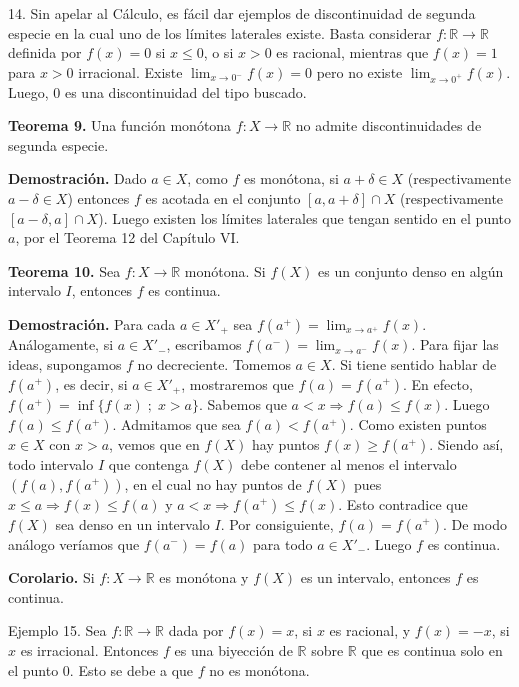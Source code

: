 \documentclass[12pt,oneside]{book}
\begin{document}
14. Sin apelar al Cálculo, es fácil dar ejemplos de discontinuidad de segunda especie en la cual uno de los límites laterales existe. Basta considerar \(f: \mathbb{R} \to \mathbb{R}\) definida por \(f(x) = 0\) si \(x \leq 0\), o si \(x > 0\) es racional, mientras que \(f(x) = 1\) para \(x > 0\) irracional. Existe \(\lim_{x \to 0^-} f(x) = 0\) pero no existe \(\lim_{x \to 0^+} f(x)\). Luego, \(0\) es una discontinuidad del tipo buscado.

\textbf{Teorema 9.} Una función monótona \(f: X \to \mathbb{R}\) no admite discontinuidades de segunda especie.

\textbf{Demostración.} Dado \(a \in X\), como \(f\) es monótona, si \(a + \delta \in X\) (respectivamente \(a - \delta \in X\)) entonces \(f\) es acotada en el conjunto \([a, a + \delta] \cap X\) (respectivamente \([a - \delta, a] \cap X\)). Luego existen los límites laterales que tengan sentido en el punto \(a\), por el Teorema 12 del Capítulo VI.

\textbf{Teorema 10.} Sea \(f: X \to \mathbb{R}\) monótona. Si \(f(X)\) es un conjunto denso en algún intervalo \(I\), entonces \(f\) es continua.

\textbf{Demostración.} Para cada \(a \in X'_+\) sea \(f(a^+) = \lim_{x \to a^+} f(x)\). Análogamente, si \(a \in X'_-\), escribamos \(f(a^-) = \lim_{x \to a^-} f(x)\). Para fijar las ideas, supongamos \(f\) no decreciente. Tomemos \(a \in X\). Si tiene sentido hablar de \(f(a^+)\), es decir, si \(a \in X'_+\), mostraremos que \(f(a) = f(a^+)\). En efecto, \(f(a^+) = \inf\{f(x) \; ; \; x > a\}\). Sabemos que \(a < x \Rightarrow f(a) \leq f(x)\). Luego \(f(a) \leq f(a^+)\). Admitamos que sea \(f(a) < f(a^+)\). Como existen puntos \(x \in X\) con \(x > a\), vemos que en \(f(X)\) hay puntos \(f(x) \geq f(a^+)\). Siendo así, todo intervalo \(I\) que contenga \(f(X)\) debe contener al menos el intervalo \((f(a), f(a^+))\), en el cual no hay puntos de \(f(X)\) pues \(x \leq a \Rightarrow f(x) \leq f(a)\) y \(a < x \Rightarrow f(a^+) \leq f(x)\). Esto contradice que \(f(X)\) sea denso en un intervalo \(I\). Por consiguiente, \(f(a) = f(a^+)\). De modo análogo veríamos que \(f(a^-) = f(a)\) para todo \(a \in X'_-\). Luego \(f\) es continua.

\textbf{Corolario.} Si \(f: X \to \mathbb{R}\) es monótona y \(f(X)\) es un intervalo, entonces \(f\) es continua.

Ejemplo 15. Sea \(f : \mathbb{R} \to \mathbb{R}\) dada por \(f(x) = x\), si \(x\) es racional, y \(f(x) = -x\), si \(x\) es irracional. Entonces \( f \) es una biyección de \( \mathbb{R} \) sobre \( \mathbb{R} \) que es continua solo en el punto \( 0 \). Esto se debe a que \( f \) no es monótona.
\end{document}
